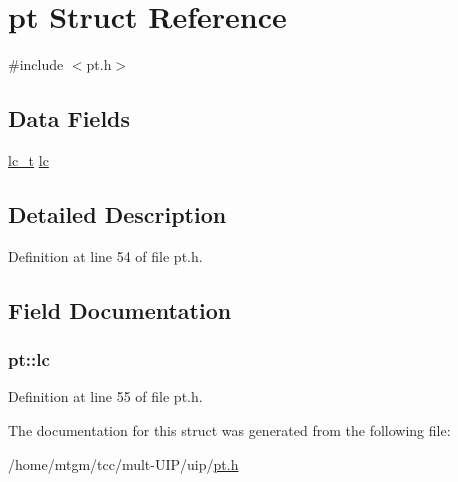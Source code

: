 \hypertarget{structpt}{
\section{pt Struct Reference}
\label{structpt}
}


{\ttfamily \#include $<$pt.h$>$}

\subsection*{Data Fields}
\begin{DoxyCompactItemize}
\item 
\hyperlink{group__lc_ga2bdc4b7b4038454a79f1b2a94a6d2a98}{lc\_\-t} \hyperlink{structpt_ac3fa0fa86689e3e7c039a16c16861dbe}{lc}
\end{DoxyCompactItemize}


\subsection{Detailed Description}


Definition at line 54 of file pt.h.



\subsection{Field Documentation}
\hypertarget{structpt_ac3fa0fa86689e3e7c039a16c16861dbe}{
\subsubsection[{lc}]{ {\bf pt::lc}}}
\label{structpt_ac3fa0fa86689e3e7c039a16c16861dbe}


Definition at line 55 of file pt.h.



The documentation for this struct was generated from the following file:\begin{DoxyCompactItemize}
\item 
/home/mtgm/tcc/mult-\/UIP/uip/\hyperlink{pt_8h}{pt.h}\end{DoxyCompactItemize}
